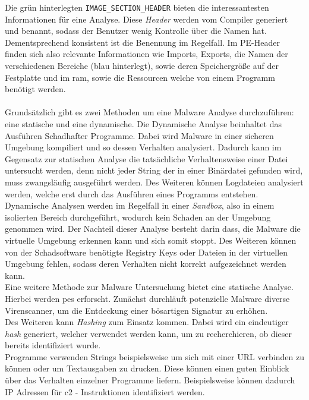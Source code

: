 \documentclass[
    12pt, %
    DIV10,
    ngerman, %
    a4paper, %
    oneside, %
    titlepage, %
    parskip=half, %
    headings=normal, %
    listof=totoc, %
    bibliography=totoc, %
    index=totoc, %
    captions=tableheading, %
    final %
]{scrreprt}
\begin{document}
Die grün hinterlegten \texttt{IMAGE\_SECTION\_HEADER} bieten die interessantesten Informationen für eine Analyse. Diese \emph{Header} werden vom Compiler generiert und benannt, sodass der Benutzer wenig Kontrolle über die Namen hat. Dementsprechend konsistent ist die Benennung im Regelfall. Im PE-Header finden sich also relevante Informationen wie Imports, Exports, die Namen der verschiedenen Bereiche (blau hinterlegt), sowie deren Speichergröße auf der Festplatte und im \ac{ram}, sowie die Ressourcen welche von einem Programm benötigt werden.
\\\\
Grundsätzlich gibt es zwei Methoden um eine Malware Analyse durchzuführen: eine statische und eine dynamische.
Die Dynamische Analyse beinhaltet das Ausführen Schadhafter Programme. Dabei wird Malware in einer sicheren Umgebung kompiliert und so dessen Verhalten analysiert. Dadurch kann im Gegensatz zur statischen Analyse die tatsächliche Verhaltensweise einer Datei untersucht werden, denn nicht jeder String der in einer Binärdatei gefunden wird, muss zwangsläufig ausgeführt werden. Des Weiteren können Logdateien analysiert werden, welche erst durch das Ausführen eines Programms entstehen.\\
Dynamische Analysen werden im Regelfall in einer \emph{Sandbox}, also in einem isolierten Bereich durchgeführt, wodurch kein Schaden an der Umgebung genommen wird.
Der Nachteil dieser Analyse besteht darin dass, die Malware die virtuelle Umgebung erkennen kann und sich somit stoppt. Des Weiteren können von der Schadsoftware benötigte Registry Keys oder Dateien in der virtuellen Umgebung fehlen, sodass deren Verhalten nicht korrekt aufgezeichnet werden kann.\\
Eine weitere Methode zur Malware Untersuchung bietet eine statische Analyse. Hierbei werden \ac{pes} erforscht. Zunächst durchläuft potenzielle Malware diverse Virenscanner, um die Entdeckung einer bösartigen Signatur zu erhöhen.\\ 
Des Weiteren kann \emph{Hashing} zum Einsatz kommen. Dabei wird ein eindeutiger \emph{hash} generiert, welcher verwendet werden kann, um zu recherchieren, ob dieser bereits identifiziert wurde.\\
Programme verwenden Strings beispielsweise um sich mit einer URL verbinden zu können oder um Textausgaben zu drucken. Diese können einen guten Einblick über das Verhalten einzelner Programme liefern. Beispielsweise können dadurch IP Adressen für \ac{c2} - Instruktionen identifiziert werden.\\
\end{document}
